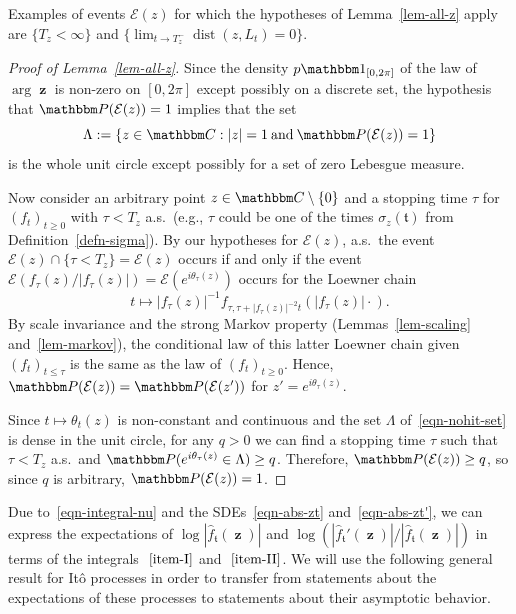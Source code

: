 \documentclass[11pt]{article}
\theoremstyle{plain}
\theoremstyle{definition}
\numberwithin{equation}{section}
\newcommand{\eqb}{\begin{equation}}
\newcommand{\eqe}{\end{equation}}
\newcommand{\eqbn}{\begin{equation*}}
\newcommand{\eqen}{\end{equation*}}
\newcommand{\BB}{\mathbbm}
\newcommand{\op}{\operatorname}
\newcommand{\rta}{\rightarrow}
\newcommand{\wh}{\widehat}
\newcommand{\mcl}{\mathcal}
\newcommand{\bdy}{\partial}
\newcommand{\zz}{{\op{\mathbf{z}}}}
\newcommand{\tz}{{\mathfrak t}}
\let\originalleft\left
\let\originalright\right
\renewcommand{\left}{\mathopen{}\mathclose\bgroup\originalleft}
\renewcommand{\right}{\aftergroup\egroup\originalright}
\begin{document}
Examples of events $\mcl E(z)$ for which the hypotheses of Lemma~\ref{lem-all-z} apply are $\{T_z < \infty\}$ and $\{\lim_{t\rta T_z^-} \op{dist}(z,L_t) = 0\}$. 

\begin{proof}[Proof of Lemma~\ref{lem-all-z}]
Since the density $p \BB 1_{[0,2\pi]}$ of the law of $\arg \zz$ is non-zero on $[0,2\pi]$ except possibly on a discrete set, the hypothesis that $\BB P(\mcl E(z)) = 1$ implies that the set
\eqb \label{eqn-nohit-set}
\Lambda := \left\{z\in \BB C : |z| = 1 \: \text{and} \: \BB P(\mcl E(z)) =1 \right\}
\eqe
is the whole unit circle except possibly for a set of zero Lebesgue measure. 

Now consider an arbitrary point $z\in\BB C\setminus \{0\}$ and a stopping time $\tau$ for $(f_t)_{t\geq 0}$ with $\tau < T_z$ a.s.\ (e.g., $\tau$ could be one of the times $\sigma_z(\tz)$ from Definition~\ref{defn-sigma}). By our hypotheses for $\mcl E(z)$, a.s.\ the event $\mcl E(z) \cap \{\tau < T_z\} = \mcl E(z)$ occurs if and only if the event $\mcl E(f_\tau(z) / |f_\tau(z)|) = \mcl E(e^{i \theta_\tau(z)} )$ occurs for the Loewner chain 
\eqbn
t \mapsto |f_\tau(z)|^{-1} f_{\tau , \tau + |f_\tau(z)|^{-2} t}(|f_\tau(z)| \cdot) .
\eqen 
By scale invariance and the strong Markov property (Lemmas~\ref{lem-scaling} and~\ref{lem-markov}), the conditional law of this latter Loewner chain given $(f_t)_{t\leq \tau}$ is the same as the law of $(f_t)_{t\geq 0}$. Hence, $\BB P(\mcl E(z)) = \BB P(\mcl E(z'))$ for $z' = e^{i \theta_\tau(z)}$.
  
Since $t\mapsto \theta_t(z) $ is non-constant and continuous and the set $\Lambda$ of~\eqref{eqn-nohit-set} is dense in the unit circle, for any $q > 0$ we can find a stopping time $\tau$ such that $\tau  < T_z$ a.s.\ and $\BB P(e^{i  \theta_\tau(z)} \in \Lambda) \geq q$. Therefore, $\BB P(\mcl E(z)) \geq q$, so since $q$ is arbitrary, $\BB P(\mcl E(z)) = 1$. 
\end{proof}



Due to~\eqref{eqn-integral-nu} and the SDEs~\eqref{eqn-abs-zt} and~\eqref{eqn-abs-zt'}, we can express the expectations of $\log|\wh f_{\tz}(\zz)|$ and $\log(|\wh f_\tz'(\zz)| / |\wh f_\tz(\zz)|)$ in terms of the integrals $~\ref{item-I}$ and $~\ref{item-II}$. 
We will use the following general result for It\^o processes in order to transfer from statements about the expectations of these processes to statements about their asymptotic behavior. 
\end{document}
